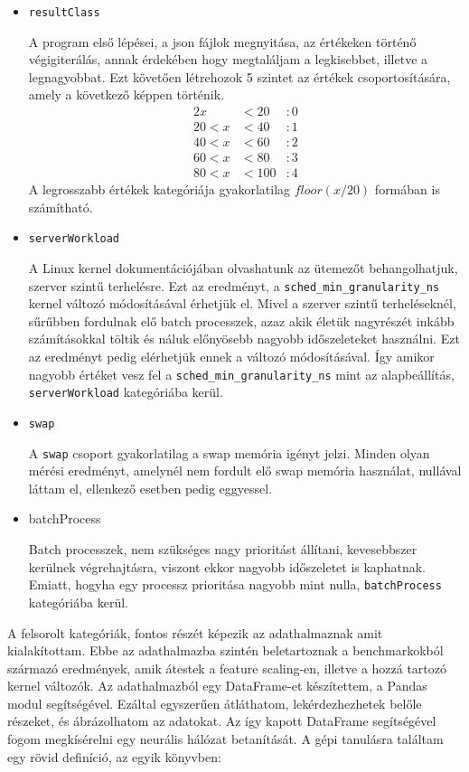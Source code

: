 \begin{itemize}
\item \texttt{resultClass}

A program első lépései, a json fájlok megnyitása, az értékeken történő végigiterálás, annak érdekében hogy megtaláljam a legkisebbet, illetve a legnagyobbat. Ezt követően létrehozok 5 szintet az értékek csoportosítására, amely a következő képpen történik.
\begin{alignat*}{2}
         x& < 20 &: 0 \\
    20 < x& < 40 &: 1 \\
    40 < x& < 60 &: 2 \\
    60 < x& < 80 &: 3 \\
    80 < x& < 100&: 4
\end{alignat*}
A legrosszabb értékek kategóriája gyakorlatilag $floor(x / 20)$ formában is számítható.

\item \texttt{serverWorkload}

A Linux kernel dokumentációjában olvashatunk az ütemezőt behangolhatjuk, szerver szintű terhelésre. Ezt az eredményt, a \texttt{sched\_min\_granularity\_ns} kernel változó módosításával érhetjük el.
Mivel a szerver szintű terheléseknél, sűrűbben fordulnak elő batch processzek, azaz akik életük nagyrészét inkább számításokkal töltik és náluk előnyösebb nagyobb időszeleteket használni. Ezt az eredményt pedig elérhetjük ennek a változó módosításával. Így amikor nagyobb értéket vesz fel a \texttt{sched\_min\_granularity\_ns} mint az alapbeállítás, \texttt{serverWorkload} kategóriába kerül.
\item \texttt{swap}

A \texttt{swap} csoport gyakorlatilag a swap memória igényt jelzi. 
Minden olyan mérési eredményt, amelynél nem fordult elő swap memória használat, nullával láttam el, ellenkező esetben pedig eggyessel.
\item batchProcess

Batch processzek, nem szükséges nagy prioritást állítani, kevesebbszer kerülnek végrehajtásra, viszont ekkor nagyobb időszeletet is kaphatnak. Emiatt, hogyha egy processz prioritása nagyobb mint nulla, \texttt{batchProcess} kategóriába kerül.
\end{itemize}

A felsorolt kategóriák, fontos részét képezik az adathalmaznak amit kialakítottam. Ebbe az adathalmazba szintén beletartoznak a benchmarkokból származó eredmények, amik átestek a feature scaling-en, illetve a hozzá tartozó kernel változók. Az adathalmazból egy DataFrame-et készítettem, a Pandas modul segítségével. Ezáltal egyszerűen átláthatom, lekérdezhezhetek belőle részeket, és ábrázolhatom az adatokat.
Az így kapott DataFrame segítségével fogom megkísérelni egy neurális hálózat betanítását. 
A gépi tanulásra találtam egy rövid definíció, az egyik könyvben:

